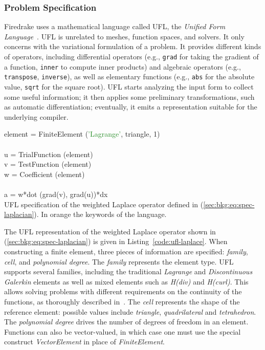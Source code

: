 \subsubsection{Problem Specification}
Firedrake uses a mathematical language called UFL, the {\em Unified Form Language}~\citep{ufl-cite}. UFL is unrelated to meshes, function spaces, and solvers. It only concerns with the variational formulation of a problem. It provides different kinds of operators, including differential operators (e.g., \texttt{grad} for taking the gradient of a function, \texttt{inner} to compute inner products) and algebraic operators (e.g., \texttt{transpose}, \texttt{inverse}), as well as elementary functions (e.g., \texttt{abs} for the absolute value, \texttt{sqrt} for the square root). UFL starts analyzing the input form to collect some useful information; it then applies some preliminary transformations, such as automatic differentiation; eventually, it emits a representation suitable for the underlying compiler.

\begin{algorithm}
\scriptsize\ttfamily
{}

element = \textcolor{RedOrange}{FiniteElement} (\textcolor{ForestGreen}{'Lagrange'}, \textcolor{RedOrange}{triangle}, 1)\\
~\\
u = \textcolor{RedOrange}{TrialFunction} (element)\\
v = \textcolor{RedOrange}{TestFunction} (element)\\
w = \textcolor{RedOrange}{Coefficient} (element)\\
~\\
a = w*\textcolor{RedOrange}{dot} (\textcolor{RedOrange}{grad}(v), \textcolor{RedOrange}{grad}(u))*\textcolor{RedOrange}{dx}\\

\caption{UFL specification of the weighted Laplace operator defined in (\ref{sec:bkg:eq:spec-laplacian}). In orange the keywords of the language. }
\label{code:ufl-laplace}
\end{algorithm}

The UFL representation of the weighted Laplace operator shown in (\ref{sec:bkg:eq:spec-laplacian}) is given in Listing~\ref{code:ufl-laplace}. When constructing a finite element, three pieces of information are specified: {\em family}, {\em cell}, and {\em polynomial degree}. The {\em family} represents the element type. UFL supports several families, including the traditional {\em Lagrange} and {\em Discontinuous Galerkin} elements as well as mixed elements such as {\em H(div)} and {\em H(curl)}. This allows solving problems with different requirements on the continuity of the functions, as thoroughly described in~\cite{Fenics}. The {\em cell} represents the shape of the reference element: possible values include {\em triangle}, {\em quadrilateral} and {\em tetrahedron}. The {\em polynomial degree} drives the number of degrees of freedom in an element. Functions can also be vector-valued, in which case one must use the special construct {\em VectorElement} in place of {\em FiniteElement}. 

